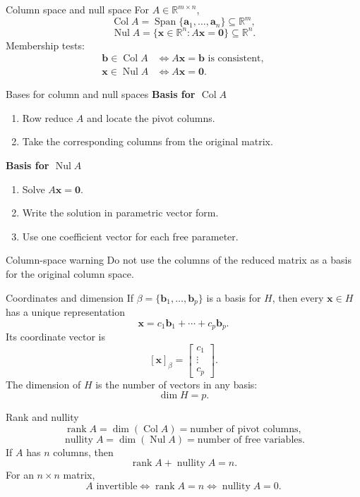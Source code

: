 \documentclass[aspectratio=169]{beamer}
\newcommand{\R}{\mathbb{R}}
\newcommand{\vect}[1]{\mathbf{#1}}
\newcommand{\Span}{\operatorname{Span}}
\newcommand{\Col}{\operatorname{Col}}
\newcommand{\Nul}{\operatorname{Nul}}
\newcommand{\rank}{\operatorname{rank}}
\newcommand{\nullity}{\operatorname{nullity}}
\begin{document}
\begin{frame}{Column space and null space}
For $A\in\R^{m\times n}$,
\[
\Col A=\Span\{\vect a_1,\ldots,\vect a_n\}\subseteq\R^m,
\]
\[
\Nul A=\{\vect x\in\R^n:A\vect x=\vect0\}\subseteq\R^n.
\]
Membership tests:
\begin{align*}
\vect b\in\Col A
&\iff A\vect x=\vect b\text{ is consistent},\\
\vect x\in\Nul A
&\iff A\vect x=\vect0.
\end{align*}
\end{frame}

\begin{frame}{Bases for column and null spaces}
\textbf{Basis for $\Col A$}
\begin{enumerate}
  \item Row reduce $A$ and locate the pivot columns.
  \item Take the corresponding columns from the original matrix.
\end{enumerate}
\medskip
\textbf{Basis for $\Nul A$}
\begin{enumerate}
  \item Solve $A\vect x=\vect0$.
  \item Write the solution in parametric vector form.
  \item Use one coefficient vector for each free parameter.
\end{enumerate}
\begin{alertblock}{Column-space warning}
Do not use the columns of the reduced matrix as a basis for the original column space.
\end{alertblock}
\end{frame}

\begin{frame}{Coordinates and dimension}
If $\beta=\{\vect b_1,\ldots,\vect b_p\}$ is a basis for $H$, then every $\vect x\in H$ has a unique representation
\[
\vect x=c_1\vect b_1+\cdots+c_p\vect b_p.
\]
Its coordinate vector is
\[
[\vect x]_\beta=\begin{bmatrix}c_1\\\vdots\\c_p\end{bmatrix}.
\]
The dimension of $H$ is the number of vectors in any basis:
\[
\dim H=p.
\]
\end{frame}

\begin{frame}{Rank and nullity}
\[
\rank A=\dim(\Col A)=\text{number of pivot columns},
\]
\[
\nullity A=\dim(\Nul A)=\text{number of free variables}.
\]
If $A$ has $n$ columns, then
\[
\boxed{\rank A+\nullity A=n}.
\]
For an $n\times n$ matrix,
\[
A\text{ invertible}
\iff \rank A=n
\iff \nullity A=0.
\]
\end{frame}
\end{document}
